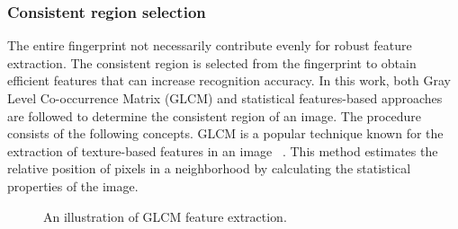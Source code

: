 \subsubsection{Consistent region selection}
The entire fingerprint not necessarily contribute evenly for robust feature
extraction. The consistent region is selected from the fingerprint to obtain
efficient features that can increase recognition accuracy. In this work, both
Gray Level Co-occurrence Matrix (GLCM) \cite{garg2020novel} and statistical
features-based approaches are followed to determine the consistent region of an
image. The procedure consists of the following concepts.
GLCM is a popular technique known for the extraction of texture-based features in an
image ~\cite{garg2020novel}. This method estimates the relative position of
pixels in a neighborhood by calculating the statistical properties of the image.
\begin{figure}[!ht]
\centering
	\hfil
	\caption{An illustration of GLCM feature extraction.}
	\label{fig:GLCM}
\end{figure}


